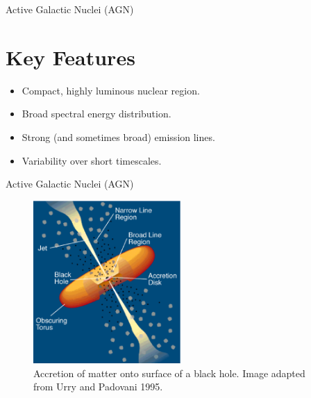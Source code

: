 \documentclass{beamer}
\begin{document}
\begin{frame}{Active Galactic Nuclei (AGN)}
  \section{Key Features}
  \begin{itemize}
    \item Compact, highly luminous nuclear region.\pause %
    \item Broad spectral energy distribution.\pause %
    \item Strong (and sometimes broad) emission lines.\pause %
    \item Variability over short timescales. %
  \end{itemize}
\end{frame}

\begin{frame}{Active Galactic Nuclei (AGN)}
  \begin{figure}
    \centering
    \includegraphics[width=0.5\textwidth]{agn_model}
    \caption{Accretion of matter onto surface of a black hole. Image adapted from Urry and Padovani 1995.\cite{Urry_1995}}
  \end{figure}
\end{frame}
\end{document}
